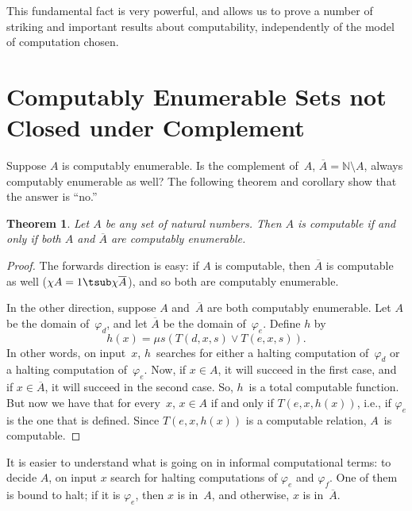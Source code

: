 \documentclass[10pt,a4paper]{article}
\theoremstyle{plain}
\newtheorem{thm}{Theorem}[section]
\theoremstyle{definition}
\theoremstyle{remark}
\newenvironment{explain}{}{}
\newcommand*{\olfileid}[3]{}
\newcommand*{\olsection}[1]{\section*{#1}}
\newcommand*{\ollabel}[1]{\label{#1}}
\providecommand{\cfind}[1]{\varphi_{#1}}
\providecommand{\Nat}{\ensuremath{\mathbb{N}}}
\providecommand{\Char}{\chi}
\providecommand{\umin}{\mu}
\providecommand{\Complement}{\overline}
\begin{document}
This fundamental fact is very powerful, and allows us to prove a
number of striking and important results about computability,
independently of the model of computation chosen.





\olfileid{cmp}{thy}{cmp}
\olsection{Computably Enumerable Sets not Closed under Complement}

Suppose $A$ is computably enumerable. Is the complement of~$A$,
$\Complement{A} = \Nat \setminus A$, always computably enumerable
as well? The following theorem and corollary show that the answer is
``no.''

\begin{thm}
\ollabel{thm:ce-comp}
Let $A$ be any set of natural numbers. Then $A$ is computable if and
only if both $A$ and $\Complement{A}$ are computably enumerable.
\end{thm}

\begin{proof}
The forwards direction is easy: if $A$ is computable, then
$\Complement{A}$ is computable as well ($\Char{A} = 1 \tsub
\Char{\Complement{A}}$), and so both are computably enumerable.

In the other direction, suppose $A$ and~$\Complement{A}$ are both
computably enumerable. Let $A$ be the domain of~$\cfind{d}$, and let
$\Complement{A}$ be the domain of~$\cfind{e}$. Define $h$ by
\[
h(x) = \umin{s}{(T(d,x,s) \lor T(e,x,s))}.
\]
In other words, on input~$x$, $h$~searches for either a halting
computation of~$\cfind{d}$ or a halting computation of~$\cfind{e}$.
Now, if $x \in A$, it will succeed in the first case, and if $x \in
\Complement{A}$, it will succeed in the second case. So, $h$~is a
total computable function. But now we have that for every~$x$, $x \in
A$ if and only if $T(e, x, h(x))$, i.e., if $\cfind{e}$ is the one
that is defined. Since $T(e, x, h(x))$ is a computable relation,
$A$~is computable.
\end{proof}

\begin{explain}
It is easier to understand what is going on in informal computational
terms: to decide $A$, on input $x$ search for halting computations of
$\cfind{e}$ and $\cfind{f}$. One of them is bound to halt; if it is $\cfind{e}$,
then $x$ is in~$A$, and otherwise, $x$ is in~$\Complement{A}$.
\end{explain}
\end{document}
